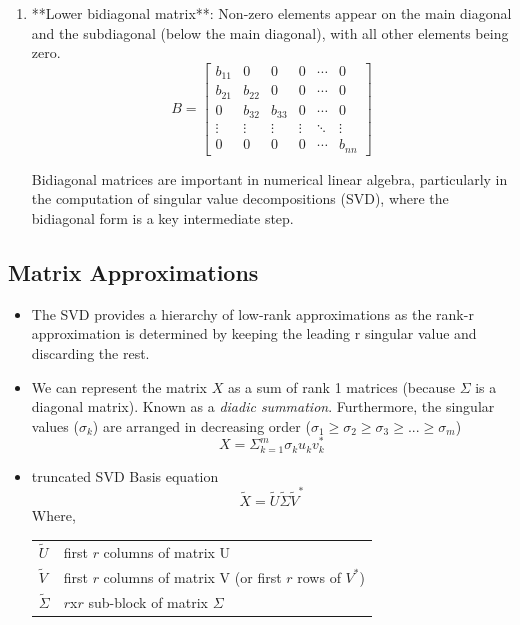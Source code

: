 \documentclass[11.5pt,a4paper]{article}
\makeatletter
\newenvironment{conditions}
  {\par\vspace{\abovedisplayskip}\noindent\begin{tabular}{>{$}l<{$} @{${}={}$} l}}
  {\end{tabular}\par\vspace{\belowdisplayskip}}
\makeatother
\begin{document}
\begin{itemize}
\begin{itemize}
\begin{itemize}
\begin{enumerate}
                \item **Lower bidiagonal matrix**: Non-zero elements appear on the main diagonal and the subdiagonal (below the main diagonal), with all other elements being zero.
               \[
               B = \begin{bmatrix}
               b_{11} & 0 & 0 & 0 & \cdots & 0 \\
               b_{21} & b_{22} & 0 & 0 & \cdots & 0 \\
               0 & b_{32} & b_{33} & 0 & \cdots & 0 \\
               \vdots & \vdots & \vdots & \vdots & \ddots & \vdots \\
               0 & 0 & 0 & 0 & \cdots & b_{nn}
               \end{bmatrix}
               \]
            
            Bidiagonal matrices are important in numerical linear algebra, particularly in the computation of singular value decompositions (SVD), where the bidiagonal form is a key intermediate step.
            \end{enumerate}
        \end{itemize}
    \end{itemize}
\end{itemize}

\subsection*{Matrix Approximations}

\begin{itemize}
    \item The SVD provides a hierarchy of low-rank approximations as the rank-r approximation is determined by keeping the leading r singular value and discarding the rest.
    \item We can represent the matrix $X$ as a sum of rank 1 matrices (because $\Sigma$ is a diagonal matrix). Known as a \textit{diadic summation}. Furthermore, the singular values ($\sigma_k$) are arranged in decreasing order ($\sigma_1 \geq \sigma_2 \geq \sigma_3 \geq ... \geq \sigma_m$)
    \begin{equation*}
        X = \Sigma^m_{k=1} \sigma_ku_kv_k^*
    \end{equation*}
    \item truncated SVD Basis equation
    \begin{equation*}
        \tilde{X} = \tilde{U}\tilde{\Sigma}\tilde{V}^*
    \end{equation*}
    Where,
    \begin{conditions}
        \tilde{U} & first $r$ columns of matrix U \\
        \tilde{V} & first $r$ columns of matrix V (or first $r$ rows of $V^*$) \\
        \tilde{\Sigma} & $r$x$r$ sub-block of matrix $\Sigma$
    \end{conditions}
\end{itemize}
\end{document}
